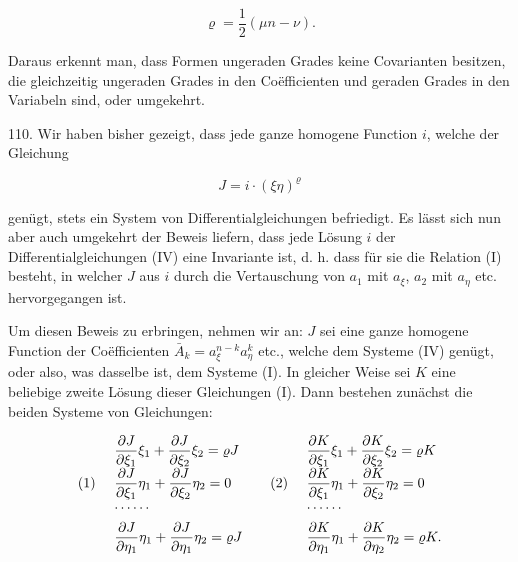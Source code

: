 \[
\varrho = \frac{1}{2}(\mu n - \nu).
\]

Daraus erkennt man, dass Formen ungeraden Grades keine Covarianten besitzen, die gleichzeitig ungeraden Grades in den Co\"efficienten und geraden Grades in den Variabeln sind, oder umgekehrt.

110.  Wir haben bisher gezeigt, dass jede ganze homogene Function $i$, welche der Gleichung

\[
J = i\cdot(\xi\eta)^\varrho \tag{I}
\]

genügt, stets ein System von Differentialgleichungen befriedigt. Es lässt sich nun aber auch umgekehrt der Beweis liefern, dass jede Lösung $i$ der Differentialgleichungen (IV) eine Invariante ist, d. h. dass für sie die Relation (I) besteht, in welcher $J$ aus $i$ durch die Vertauschung von $a_1$ mit $a_\xi$, $a_2$ mit $a_\eta$ etc. hervorgegangen ist.


Um diesen Beweis zu erbringen, nehmen wir an: $J$ sei eine ganze homogene Function der Co\"efficienten $\bar A_k = a_\xi^{n-k}a_\eta^k$ etc., welche dem Systeme (IV) genügt, oder also, was dasselbe ist, dem Systeme (I). In gleicher Weise sei $K$ eine beliebige zweite Lösung dieser Gleichungen (I). Dann bestehen zunächst die beiden Systeme von Gleichungen:

\[
\begin{array}{r@{\ }l@{\qquad}r@{\ }l}
& \dfrac{\partial J}{\partial \xi_1}\xi_1+\dfrac{\partial J}{\partial \xi_2}\xi_2=\varrho J
& & \dfrac{\partial K}{\partial \xi_1}\xi_1+\dfrac{\partial K}{\partial \xi_2}\xi_2=\varrho K\\[6pt]
(1)\quad & \dfrac{\partial J}{\partial \xi_1}\eta_1+\dfrac{\partial J}{\partial \xi_2}\eta_2=0
& (2)\quad & \dfrac{\partial K}{\partial \xi_1}\eta_1+\dfrac{\partial K}{\partial \xi_2}\eta_2=0\\[4pt]
& \cdots\cdots
& & \cdots\cdots\\[4pt]
& \dfrac{\partial J}{\partial \eta_1}\eta_1+\dfrac{\partial J}{\partial \eta_1}\eta_2=\varrho J
& & \dfrac{\partial K}{\partial \eta_1}\eta_1+\dfrac{\partial K}{\partial \eta_2}\eta_2=\varrho K.
\end{array}
\]

